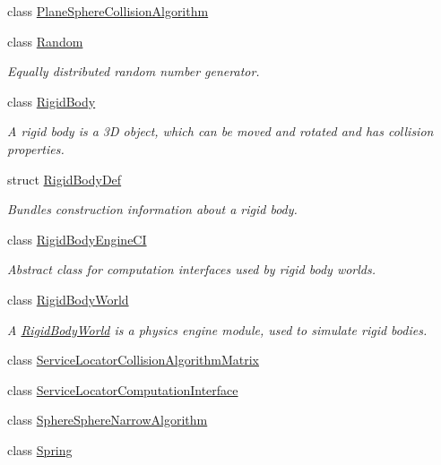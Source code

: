 \begin{DoxyCompactItemize}
\item 
class \mbox{\hyperlink{classr3_1_1_plane_sphere_collision_algorithm}{Plane\+Sphere\+Collision\+Algorithm}}
\item 
class \mbox{\hyperlink{classr3_1_1_random}{Random}}
\begin{DoxyCompactList}\small\item\em Equally distributed random number generator. \end{DoxyCompactList}\item 
class \mbox{\hyperlink{classr3_1_1_rigid_body}{Rigid\+Body}}
\begin{DoxyCompactList}\small\item\em A rigid body is a 3D object, which can be moved and rotated and has collision properties. \end{DoxyCompactList}\item 
struct \mbox{\hyperlink{structr3_1_1_rigid_body_def}{Rigid\+Body\+Def}}
\begin{DoxyCompactList}\small\item\em Bundles construction information about a rigid body. \end{DoxyCompactList}\item 
class \mbox{\hyperlink{classr3_1_1_rigid_body_engine_c_i}{Rigid\+Body\+Engine\+CI}}
\begin{DoxyCompactList}\small\item\em Abstract class for computation interfaces used by rigid body worlds. \end{DoxyCompactList}\item 
class \mbox{\hyperlink{classr3_1_1_rigid_body_world}{Rigid\+Body\+World}}
\begin{DoxyCompactList}\small\item\em A \mbox{\hyperlink{classr3_1_1_rigid_body_world}{Rigid\+Body\+World}} is a physics engine module, used to simulate rigid bodies. \end{DoxyCompactList}\item 
class \mbox{\hyperlink{classr3_1_1_service_locator_collision_algorithm_matrix}{Service\+Locator\+Collision\+Algorithm\+Matrix}}
\item 
class \mbox{\hyperlink{classr3_1_1_service_locator_computation_interface}{Service\+Locator\+Computation\+Interface}}
\item 
class \mbox{\hyperlink{classr3_1_1_sphere_sphere_narrow_algorithm}{Sphere\+Sphere\+Narrow\+Algorithm}}
\item 
class \mbox{\hyperlink{classr3_1_1_spring}{Spring}}

\end{DoxyCompactItemize}

